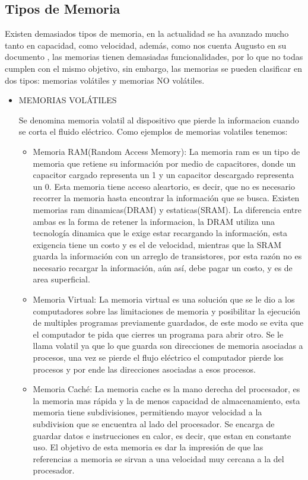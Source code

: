 \documentclass{article}
\begin{document}
\subsection{Tipos de Memoria}\label{pregunta2}
Existen demasiados tipos de memoria, en la actualidad se ha avanzado mucho tanto en capacidad, como velocidad, además, como nos cuenta Augusto en su documento \cite{referencia}, las memorias tienen demasiadas funcionalidades, por lo que no todas cumplen con el mismo objetivo, sin embargo, las memorias se pueden clasificar en dos tipos: memorias volátiles y memorias NO volátiles.
\begin{itemize}
    \item
    MEMORIAS VOLÁTILES
    
    Se denomina memoria volatil al dispositivo que pierde la informacion cuando se corta el fluido eléctrico. Como ejemplos de memorias volatiles tenemos:
    \begin{itemize}
        \item
        Memoria RAM(Random Access Memory): La memoria ram es un tipo de memoria que retiene su información por medio de capacitores, donde un capacitor cargado representa un 1 y un capacitor descargado representa un 0. Esta memoria tiene acceso aleartorio, es decir, que no es necesario recorrer la memoria hasta encontrar la información que se busca. Existen memorias ram dinamicas(DRAM) y estaticas(SRAM). La diferencia entre ambas es la forma de retener la informacion, la DRAM  utiliza una tecnología dinamica que le exige estar recargando la información, esta exigencia tiene un costo y es el de velocidad, mientras que la SRAM guarda la información con un arreglo de transistores, por esta razón no es necesario recargar la información, aún así, debe pagar un costo, y es de area superficial.
        
        \item
        Memoria Virtual: La memoria virtual es una solución que se le dio a los computadores sobre las limitaciones de memoria y posibilitar la ejecución de multiples programas previamente guardados, de este modo se evita que el computador te pida que cierres un programa para abrir otro. Se le llama volatil ya que lo que guarda son direcciones de memoria asociadas a procesos, una vez se pierde el flujo eléctrico el computador pierde los procesos y por ende las direcciones asociadas a esos procesos.
        
        \item
        Memoria Caché: La memoria cache es la mano derecha del procesador, es la memoria mas rápida y la de menos capacidad de almacenamiento, esta memoria tiene subdivisiones, permitiendo mayor velocidad a la subdivision que se encuentra al lado del procesador. Se encarga de guardar datos e instrucciones en calor, es decir, que estan en constante uso. El objetivo de esta memoria es dar la impresión de que las referencias a memoria se sirvan  a una velocidad muy cercana  a la del procesador.
    

\end{itemize}
\end{itemize}
\end{document}
